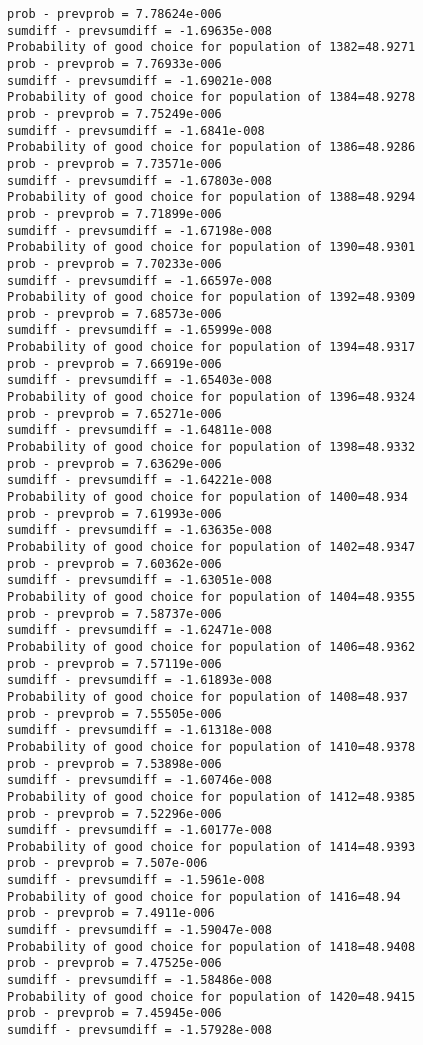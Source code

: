 \documentclass[11pt,onecolumn]{article}
\begin{document}
\begin{verbatim}
prob - prevprob = 7.78624e-006
sumdiff - prevsumdiff = -1.69635e-008
Probability of good choice for population of 1382=48.9271
prob - prevprob = 7.76933e-006
sumdiff - prevsumdiff = -1.69021e-008
Probability of good choice for population of 1384=48.9278
prob - prevprob = 7.75249e-006
sumdiff - prevsumdiff = -1.6841e-008
Probability of good choice for population of 1386=48.9286
prob - prevprob = 7.73571e-006
sumdiff - prevsumdiff = -1.67803e-008
Probability of good choice for population of 1388=48.9294
prob - prevprob = 7.71899e-006
sumdiff - prevsumdiff = -1.67198e-008
Probability of good choice for population of 1390=48.9301
prob - prevprob = 7.70233e-006
sumdiff - prevsumdiff = -1.66597e-008
Probability of good choice for population of 1392=48.9309
prob - prevprob = 7.68573e-006
sumdiff - prevsumdiff = -1.65999e-008
Probability of good choice for population of 1394=48.9317
prob - prevprob = 7.66919e-006
sumdiff - prevsumdiff = -1.65403e-008
Probability of good choice for population of 1396=48.9324
prob - prevprob = 7.65271e-006
sumdiff - prevsumdiff = -1.64811e-008
Probability of good choice for population of 1398=48.9332
prob - prevprob = 7.63629e-006
sumdiff - prevsumdiff = -1.64221e-008
Probability of good choice for population of 1400=48.934
prob - prevprob = 7.61993e-006
sumdiff - prevsumdiff = -1.63635e-008
Probability of good choice for population of 1402=48.9347
prob - prevprob = 7.60362e-006
sumdiff - prevsumdiff = -1.63051e-008
Probability of good choice for population of 1404=48.9355
prob - prevprob = 7.58737e-006
sumdiff - prevsumdiff = -1.62471e-008
Probability of good choice for population of 1406=48.9362
prob - prevprob = 7.57119e-006
sumdiff - prevsumdiff = -1.61893e-008
Probability of good choice for population of 1408=48.937
prob - prevprob = 7.55505e-006
sumdiff - prevsumdiff = -1.61318e-008
Probability of good choice for population of 1410=48.9378
prob - prevprob = 7.53898e-006
sumdiff - prevsumdiff = -1.60746e-008
Probability of good choice for population of 1412=48.9385
prob - prevprob = 7.52296e-006
sumdiff - prevsumdiff = -1.60177e-008
Probability of good choice for population of 1414=48.9393
prob - prevprob = 7.507e-006
sumdiff - prevsumdiff = -1.5961e-008
Probability of good choice for population of 1416=48.94
prob - prevprob = 7.4911e-006
sumdiff - prevsumdiff = -1.59047e-008
Probability of good choice for population of 1418=48.9408
prob - prevprob = 7.47525e-006
sumdiff - prevsumdiff = -1.58486e-008
Probability of good choice for population of 1420=48.9415
prob - prevprob = 7.45945e-006
sumdiff - prevsumdiff = -1.57928e-008

\end{verbatim}
\end{document}
